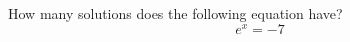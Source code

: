 \documentclass{ximera}
\author{David Kish}
\begin{document}
\begin{exercise}
How many solutions does the following equation have? \\
\[
e^{x}=-7
\]
\begin{multipleChoice}  
\end{multipleChoice}  
\end{exercise}
\end{document}
